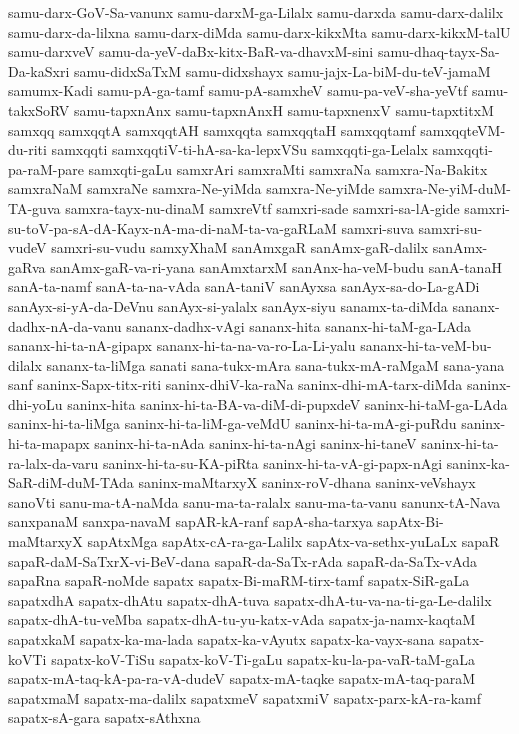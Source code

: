 {samu-darx-GoV-Sa-vanunx
samu-darxM-ga-Lilalx
samu-darxda
samu-darx-dalilx
samu-darx-da-lilxna
samu-darx-diMda
samu-darx-kikxMta
samu-darx-kikxM-talU
samu-darxveV
samu-da-yeV-daBx-kitx-BaR-va-dhavxM-sini
samu-dhaq-tayx-Sa-Da-kaSxri
samu-didxSaTxM
samu-didxshayx
samu-jajx-La-biM-du-teV-jamaM
samumx-Kadi
samu-pA-ga-tamf
samu-pA-samxheV
samu-pa-veV-sha-yeVtf
samu-takxSoRV
samu-tapxnAnx
samu-tapxnAnxH
samu-tapxnenxV
samu-tapxtitxM
samxqq
samxqqtA
samxqqtAH
samxqqta
samxqqtaH
samxqqtamf
samxqqteVM-du-riti
samxqqti
samxqqtiV-ti-hA-sa-ka-lepxVSu
samxqqti-ga-Lelalx
samxqqti-pa-raM-pare
samxqti-gaLu
samxrAri
samxraMti
samxraNa
samxra-Na-Bakitx
samxraNaM
samxraNe
samxra-Ne-yiMda
samxra-Ne-yiMde
samxra-Ne-yiM-duM-TA-guva
samxra-tayx-nu-dinaM
samxreVtf
samxri-sade
samxri-sa-lA-gide
samxri-su-toV-pa-sA-dA-Kayx-nA-ma-di-naM-ta-va-gaRLaM
samxri-suva
samxri-su-vudeV
samxri-su-vudu
samxyXhaM
sanAmxgaR
sanAmx-gaR-dalilx
sanAmx-gaRva
sanAmx-gaR-va-ri-yana
sanAmxtarxM
sanAnx-ha-veM-budu
sanA-tanaH
sanA-ta-namf
sanA-ta-na-vAda
sanA-taniV
sanAyxsa
sanAyx-sa-do-La-gADi
sanAyx-si-yA-da-DeVnu
sanAyx-si-yalalx
sanAyx-siyu
sanamx-ta-diMda
sananx-dadhx-nA-da-vanu
sananx-dadhx-vAgi
sananx-hita
sananx-hi-taM-ga-LAda
sananx-hi-ta-nA-gipapx
sananx-hi-ta-na-va-ro-La-Li-yalu
sananx-hi-ta-veM-bu-dilalx
sananx-ta-liMga
sanati
sana-tukx-mAra
sana-tukx-mA-raMgaM
sana-yana
sanf
saninx-Sapx-titx-riti
saninx-dhiV-ka-raNa
saninx-dhi-mA-tarx-diMda
saninx-dhi-yoLu
saninx-hita
saninx-hi-ta-BA-va-diM-di-pupxdeV
saninx-hi-taM-ga-LAda
saninx-hi-ta-liMga
saninx-hi-ta-liM-ga-veMdU
saninx-hi-ta-mA-gi-puRdu
saninx-hi-ta-mapapx
saninx-hi-ta-nAda
saninx-hi-ta-nAgi
saninx-hi-taneV
saninx-hi-ta-ra-lalx-da-varu
saninx-hi-ta-su-KA-piRta
saninx-hi-ta-vA-gi-papx-nAgi
saninx-ka-SaR-diM-duM-TAda
saninx-maMtarxyX
saninx-roV-dhana
saninx-veVshayx
sanoVti
sanu-ma-tA-naMda
sanu-ma-ta-ralalx
sanu-ma-ta-vanu
sanunx-tA-Nava
sanxpanaM
sanxpa-navaM
sapAR-kA-ranf
sapA-sha-tarxya
sapAtx-Bi-maMtarxyX
sapAtxMga
sapAtx-cA-ra-ga-Lalilx
sapAtx-va-sethx-yuLaLx
sapaR
sapaR-daM-SaTxrX-vi-BeV-dana
sapaR-da-SaTx-rAda
sapaR-da-SaTx-vAda
sapaRna
sapaR-noMde
sapatx
sapatx-Bi-maRM-tirx-tamf
sapatx-SiR-gaLa
sapatxdhA
sapatx-dhAtu
sapatx-dhA-tuva
sapatx-dhA-tu-va-na-ti-ga-Le-dalilx
sapatx-dhA-tu-veMba
sapatx-dhA-tu-yu-katx-vAda
sapatx-ja-namx-kaqtaM
sapatxkaM
sapatx-ka-ma-lada
sapatx-ka-vAyutx
sapatx-ka-vayx-sana
sapatx-koVTi
sapatx-koV-TiSu
sapatx-koV-Ti-gaLu
sapatx-ku-la-pa-vaR-taM-gaLa
sapatx-mA-taq-kA-pa-ra-vA-dudeV
sapatx-mA-taqke
sapatx-mA-taq-paraM
sapatxmaM
sapatx-ma-dalilx
sapatxmeV
sapatxmiV
sapatx-parx-kA-ra-kamf
sapatx-sA-gara
sapatx-sAthxna
}
